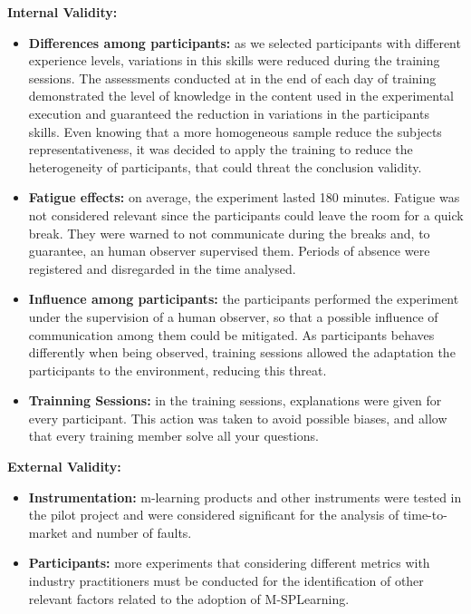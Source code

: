 \textbf{Internal Validity:}

\begin{itemize}
\item \textbf{Differences among participants:} as we selected participants with different experience levels, variations in this skills were reduced during the training sessions. The assessments conducted at in the end of each day of training demonstrated the level of knowledge in the content used in the experimental execution and guaranteed the reduction in variations in the participants skills. Even knowing that a more homogeneous sample reduce the subjects representativeness, it was decided to apply the training to reduce the heterogeneity of participants, that could threat the conclusion validity.

\item \textbf{Fatigue effects:} on average, the experiment lasted 180 minutes. Fatigue was not considered relevant since the participants could leave the room for a quick break. They were warned to not communicate during the breaks and, to guarantee, an human observer supervised them. Periods of absence were registered and disregarded in the time analysed.



\item \textbf{Influence among participants:} the participants performed the experiment under the supervision of a human observer, so that a possible influence of communication among them could be mitigated. As participants behaves differently when being observed, training sessions allowed the adaptation the participants to the environment, reducing this threat.

\item \textbf{Trainning Sessions:} in the training sessions, explanations were given for every participant. This action was taken to avoid possible biases, and allow that every training member solve all your questions.
\end{itemize}

\textbf{External Validity:}

\begin{itemize}

\item \textbf{Instrumentation:} m-learning products and other instruments were tested in the pilot project and were considered significant for the analysis of time-to-market and number of faults.

\item \textbf{Participants:} more experiments that considering different metrics with industry practitioners must be conducted for the identification of other relevant factors related to the adoption of M-SPLear\allowbreak ning.

\end{itemize}

